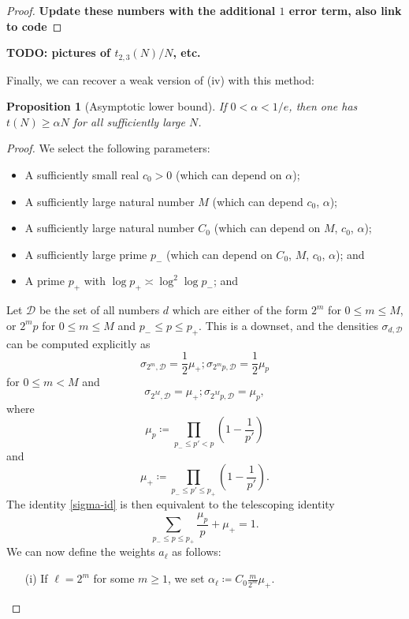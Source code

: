 \documentclass[12pt,a4paper,reqno]{amsart}
\numberwithin{equation}{section}
\theoremstyle{plain}
\newtheorem{proposition}[theorem]{Proposition}
\theoremstyle{definition}
\begin{document}
\begin{proof}
{\bf Update these numbers with the additional $1$ error term, also link to code}
\end{proof}

{\bf TODO: pictures of $t_{2,3}(N)/N$, etc. }

Finally, we can recover a weak version of (iv) with this method:

\begin{proposition}[Asymptotic lower bound]\label{asymp}  If $0 < \alpha < 1/e$, then one has $t(N) \geq \alpha N$ for all sufficiently large $N$.
\end{proposition}

\begin{proof}  We select the following parameters:
  \begin{itemize}
  \item A sufficiently small real $c_0>0$ (which can depend on $\alpha$);
  \item A sufficiently large natural number $M$ (which can depend $c_0$, $\alpha$);
  \item A sufficiently large natural number $C_0$ (which can depend on $M$, $c_0$, $\alpha$);
  \item A sufficiently large prime $p_-$ (which can depend on $C_0$, $M$, $c_0$, $\alpha$); and
  \item A prime $p_+$ with $\log p_+ \asymp \log^2 \log p_-$; and
  \end{itemize}
Let ${\mathcal D}$ be the set of all numbers $d$ which are either of the form $2^m$ for $0 \leq m \leq M$, or $2^m p$ for $0 \leq m \leq M$ and $p_- \leq p \leq p_+$.  This is a downset, and the densities $\sigma_{d,{\mathcal D}}$ can be computed explicitly as
$$ \sigma_{2^m,{\mathcal D}} = \frac{1}{2} \mu_+; \sigma_{2^m p,{\mathcal D}} = \frac{1}{2} \mu_p$$
for $0 \leq m < M$ and
$$ \sigma_{2^M,{\mathcal D}} = \mu_+; \sigma_{2^M p,{\mathcal D}} = \mu_p,$$
where
$$ \mu_p \coloneqq \prod_{p_- \leq p' < p} \left( 1 - \frac{1}{p'} \right)$$
and
$$ \mu_+ \coloneqq \prod_{p_- \leq p' \leq p_+} \left( 1 - \frac{1}{p'} \right).$$
The identity \eqref{sigma-id} is then equivalent to the telescoping identity
\begin{equation}\label{telescope}
   \sum_{p_- \leq p \leq p_+} \frac{\mu_p}{p} + \mu_+ = 1.
\end{equation}
We can now define the weights $a_\ell$ as follows:
\begin{itemize}
\item[(i)] If $\ell = 2^m$ for some $m \geq 1$, we set $\alpha_\ell \coloneqq C_0 \frac{m}{2^m} \mu_+$.

\end{itemize}
\end{proof}
\end{document}
